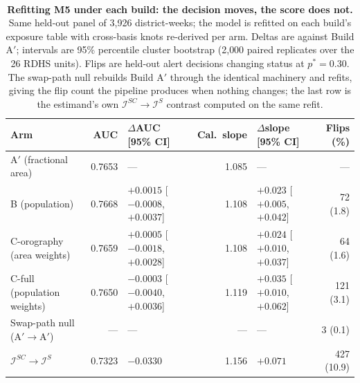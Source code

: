 \documentclass[11pt,a4paper]{article}
\providecommand{\REBUILD}{\textsuperscript{\ddag}}
\begin{document}
\begin{table}[htbp]
\centering
\caption{\textbf{Refitting M5 under each build: the decision moves, the score does not.}\REBUILD{} Same held-out panel of 3{,}926 district-weeks; the model is refitted on each build's exposure table with cross-basis knots re-derived per arm. Deltas are against Build A$'$; intervals are 95\% percentile cluster bootstrap (2{,}000 paired replicates over the 26 RDHS units). Flips are held-out alert decisions changing status at $p^*=0.30$. The swap-path null rebuilds Build A$'$ through the identical machinery and refits, giving the flip count the pipeline produces when nothing changes; the last row is the estimand's own $\mathcal I^{SC}\to\mathcal I^{S}$ contrast computed on the same refit.}
\label{tab:wp5-refit}
{\footnotesize\begin{tabular}{@{}lrlrlr@{}}
\toprule
Arm & AUC & $\Delta$AUC [95\% CI] & Cal.\ slope & $\Delta$slope [95\% CI] & Flips (\%) \\
\midrule
A$'$ (fractional area)      & 0.7653 & ---                              & 1.085 & ---                           & --- \\
B (population)              & 0.7668 & $+0.0015$ [$-0.0008$, $+0.0037$] & 1.108 & $+0.023$ [$+0.005$, $+0.042$] & 72 (1.8) \\
C-orography (area weights)  & 0.7659 & $+0.0005$ [$-0.0018$, $+0.0028$] & 1.108 & $+0.024$ [$+0.010$, $+0.037$] & 64 (1.6) \\
C-full (population weights) & 0.7650 & $-0.0003$ [$-0.0040$, $+0.0036$] & 1.119 & $+0.035$ [$+0.010$, $+0.062$] & 121 (3.1) \\
\midrule
Swap-path null (A$'\to$A$'$) & ---   & ---                              & ---   & ---                           & 3 (0.1) \\
$\mathcal I^{SC}\to\mathcal I^{S}$ & 0.7323 & $-0.0330$                 & 1.156 & $+0.071$                      & 427 (10.9) \\
\bottomrule
\end{tabular}}
\end{table}
\end{document}
